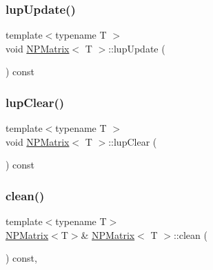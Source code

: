 \mbox{\label{class_n_p_matrix_ab0bb16a2c2fb70a2294eb5f64c5530df}} 
\subsubsection{\texorpdfstring{lupUpdate()}{lupUpdate()}}
{\footnotesize\ttfamily template$<$typename T $>$ \\
void \mbox{\hyperlink{class_n_p_matrix}{N\+P\+Matrix}}$<$ T $>$\+::lup\+Update (\begin{DoxyParamCaption}{ }\end{DoxyParamCaption}) const\hspace{0.3cm}{\ttfamily [protected]}}

\mbox{\label{class_n_p_matrix_aa10cc45e0f51b547e4b9a9b89e95d007}} 
\subsubsection{\texorpdfstring{lupClear()}{lupClear()}}
{\footnotesize\ttfamily template$<$typename T $>$ \\
void \mbox{\hyperlink{class_n_p_matrix}{N\+P\+Matrix}}$<$ T $>$\+::lup\+Clear (\begin{DoxyParamCaption}{ }\end{DoxyParamCaption}) const\hspace{0.3cm}{\ttfamily [protected]}}

\mbox{\label{class_n_p_matrix_ad6c14f6a92b15709ddee8213067c8955}} 
\subsubsection{\texorpdfstring{clean()}{clean()}}
{\footnotesize\ttfamily template$<$typename T$>$ \\
\mbox{\hyperlink{class_n_p_matrix}{N\+P\+Matrix}}$<$T$>$\& \mbox{\hyperlink{class_n_p_matrix}{N\+P\+Matrix}}$<$ T $>$\+::clean (\begin{DoxyParamCaption}{ }\end{DoxyParamCaption}) const\hspace{0.3cm}{\ttfamily [inline]}, {\ttfamily [protected]}}

